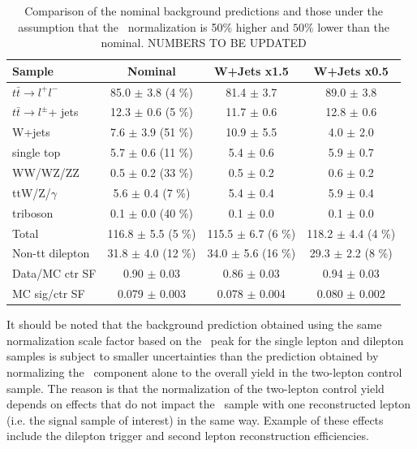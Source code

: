 \begin{table}
\begin{center}
\begin{tabular}{l|c|c|c}
\hline
	Sample 	& Nominal	& W+Jets x1.5		& W+Jets x0.5\\
\hline
\hline
$t\bar{t} \rightarrow l^{+}l^{-} $ 	 & 	 85.0 $\pm$ 3.8 (4 \%)			 & 	 81.4 $\pm$ 3.7			 & 	 89.0 $\pm$ 3.8 \\  
$t\bar{t} \rightarrow l^{\pm} $+ jets 	 & 	 12.3 $\pm$ 0.6 (5 \%) 			 & 	 11.7 $\pm$ 0.6  		 & 	 12.8 $\pm$ 0.6 \\  
W+jets 	 & 	 7.6 $\pm$ 3.9 (51 \%) 							 & 	 10.9 $\pm$ 5.5  		 & 	 4.0 $\pm$ 2.0 \\   
single top 	 & 	 5.7 $\pm$ 0.6 (11 \%) 						 & 	 5.4 $\pm$ 0.6   		 & 	 5.9 $\pm$ 0.7 \\   
WW/WZ/ZZ 	 & 	 0.5 $\pm$ 0.2 (33 \%) 						 & 	 0.5 $\pm$ 0.2   		 & 	 0.6 $\pm$ 0.2 \\   
ttW/Z/$\gamma$ 	 & 	 5.6 $\pm$ 0.4 (7 \%) 						 & 	 5.4 $\pm$ 0.4   		 & 	 5.9 $\pm$ 0.4 \\   
triboson 	 & 	 0.1 $\pm$ 0.0 (40 \%) 						 & 	 0.1 $\pm$ 0.0   		 & 	 0.1 $\pm$ 0.0 \\   
\hline
Total 	 & 	 116.8 $\pm$ 5.5 (5 \%)						 & 	 115.5 $\pm$ 6.7 (6 \%)	& 	 118.2 $\pm$ 4.4 (4 \%) \\
\hline
Non-tt dilepton 	 & 	 31.8 $\pm$ 4.0 (12 \%)				& 	 34.0 $\pm$ 5.6 (16 \%)		& 	 29.3 $\pm$ 2.2 (8 \%) \\
\hline
\hline
Data/MC ctr SF &	0.90 $\pm$ 0.03	& 0.86 $\pm$ 0.03	&	0.94 $\pm$ 0.03 \\
\hline
MC sig/ctr SF &		0.079 $\pm$ 0.003	& 0.078 $\pm$ 0.004	&	0.080 $\pm$ 0.002 \\
\hline
\end{tabular}
\caption{Comparison of the nominal background predictions and those
  under the assumption that the \wjets\ normalization is 50\%
  higher and $50\%$ lower than the nominal. NUMBERS TO BE UPDATED 
  \label{tab:samplecomposition}%
}  
\end{center}
\end{table}

It should be noted that the background prediction obtained using
the same normalization scale factor based on the \mt\ peak for the 
single lepton and dilepton samples is subject to smaller uncertainties
than the prediction obtained by normalizing the \ttll\ component alone
to the overall yield in the two-lepton control sample. The reason is 
that the normalization of the two-lepton control yield depends on
effects that do not impact the \ttll\ sample with one reconstructed
lepton (i.e. the signal sample of interest) in the same way. Example
of these effects include the dilepton trigger and second lepton
reconstruction efficiencies.

